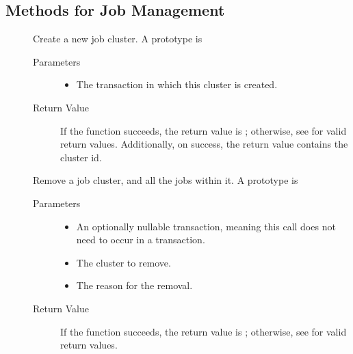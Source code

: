 \subsection{\label{WebService-JobManagement} Methods for Job Management}

\begin{description}
\item []
  Create a new job cluster.
  A prototype is 


  \begin{description}
    \item[ Parameters]
    \begin{itemize}
      \item {} 
      The transaction in which this cluster is created.
    \end{itemize}
    \item[ Return Value]
      If the function succeeds, the return value is ; 
      otherwise, see  for valid return values. Additionally,
      on success, the return value contains the cluster id.
  \end{description}

\item []
  Remove a job cluster, and all the jobs within it.
  A prototype is 


  \begin{description}
    \item[ Parameters]
    \begin{itemize}
      \item {} 
      An optionally nullable transaction, meaning this call does not 
      need to occur in a transaction. 
      \item {} 
      The cluster to remove.
      \item {}
      The reason for the removal.
    \end{itemize}
    \item[ Return Value]
      If the function succeeds, the return value is ; 
      otherwise, see  for valid return values. 
  \end{description}


\end{description}
